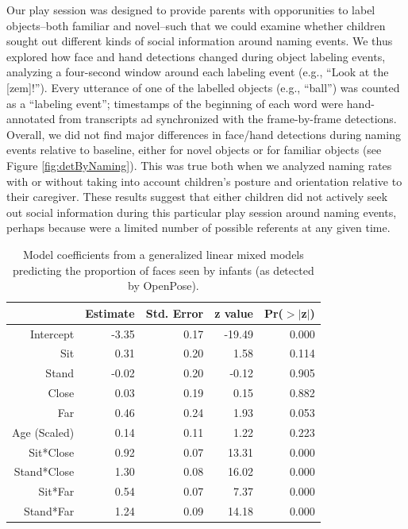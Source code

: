 \documentclass[english,man,floatsintext]{apa6}
\begin{document}
Our play session was designed to provide parents with opporunities to
label objects--both familiar and novel--such that we could examine
whether children sought out different kinds of social information around
naming events. We thus explored how face and hand detections changed
during object labeling events, analyzing a four-second window around
each labeling event (e.g., \enquote{Look at the {[}zem{]}!}). Every
utterance of one of the labelled objects (e.g., \enquote{ball}) was
counted as a \enquote{labeling event}; timestamps of the beginning of
each word were hand-annotated from transcripts ad synchronized with the
frame-by-frame detections. Overall, we did not find major differences in
face/hand detections during naming events relative to baseline, either
for novel objects or for familiar objects (see Figure
\ref{fig:detByNaming}). This was true both when we analyzed naming rates
with or without taking into account children's posture and orientation
relative to their caregiver. These results suggest that either children
did not actively seek out social information during this particular play
session around naming events, perhaps because were a limited number of
possible referents at any given time.

\begin{table}[ht]
\centering
\begin{tabular}{rrrrr}
  \hline
 & Estimate & Std. Error & z value & Pr($>$$|$z$|$) \\
  \hline
Intercept & -3.35 & 0.17 & -19.49 & 0.000 \\
  Sit & 0.31 & 0.20 & 1.58 & 0.114 \\
  Stand & -0.02 & 0.20 & -0.12 & 0.905 \\
  Close & 0.03 & 0.19 & 0.15 & 0.882 \\
  Far & 0.46 & 0.24 & 1.93 & 0.053 \\
  Age (Scaled) & 0.14 & 0.11 & 1.22 & 0.223 \\
  Sit*Close & 0.92 & 0.07 & 13.31 & 0.000 \\
  Stand*Close & 1.30 & 0.08 & 16.02 & 0.000 \\
  Sit*Far & 0.54 & 0.07 & 7.37 & 0.000 \\
  Stand*Far & 1.24 & 0.09 & 14.18 & 0.000 \\
   \hline
\end{tabular}
\caption{Model coefficients from a generalized linear mixed models predicting the proportion of faces seen by infants (as detected by OpenPose).}
\end{table}
\end{document}
